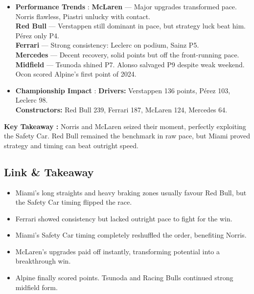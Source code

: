 \begin{itemize}
    \item \textbf{Performance Trends} : \textbf{McLaren} — Major upgrades transformed pace. Norris flawless, Piastri unlucky with contact.\\
    \textbf{Red Bull} — Verstappen still dominant in pace, but strategy luck beat him. Pérez only P4.\\
    \textbf{Ferrari} — Strong consistency: Leclerc on podium, Sainz P5.\\
    \textbf{Mercedes} — Decent recovery, solid points but off the front-running pace.\\
    \textbf{Midfield} — Tsunoda shined P7. Alonso salvaged P9 despite weak weekend. Ocon scored Alpine’s first point of 2024.
    
    \item \textbf{Championship Impact} : \textbf{Drivers:} Verstappen 136 points, Pérez 103, Leclerc 98.\\
    \textbf{Constructors:} Red Bull 239, Ferrari 187, McLaren 124, Mercedes 64.    
\end{itemize}

\textbf{Key Takeaway :}
Norris and McLaren seized their moment, perfectly exploiting the Safety Car. Red Bull remained the benchmark in raw pace, but Miami proved strategy and timing can beat outright speed.


\subsection{Link \& Takeaway}

\begin{itemize}
    \item Miami’s long straights and heavy braking zones usually favour Red Bull, but the Safety Car timing flipped the race. 
    \item Ferrari showed consistency but lacked outright pace to fight for the win.
    \item Miami’s Safety Car timing completely reshuffled the order, benefiting Norris. 
    \item McLaren’s upgrades paid off instantly, transforming potential into a breakthrough win. 
    \item Alpine finally scored points. Tsunoda and Racing Bulls continued strong midfield form.
\end{itemize}